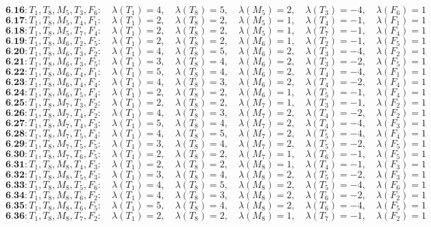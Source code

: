 \documentclass[12p]{article}
\numberwithin{equation}{section}
\begin{document}
\[
\textbf{6.16}: T_1, T_8, M_5, T_3, F_6:\quad \lambda(T_1) = 4,\quad \lambda(T_8) = 5,\quad \lambda(M_5) = 2,\quad \lambda(T_3) = -4,\quad \lambda(F_6) = 1
\]
\[
\textbf{6.17}: T_1, T_8, M_5, T_4, F_1:\quad \lambda(T_1) = 2,\quad \lambda(T_8) = 2,\quad \lambda(M_5) = 1,\quad \lambda(T_4) = -1,\quad \lambda(F_1) = 1
\]
\[
\textbf{6.18}: T_1, T_8, M_5, T_7, F_4:\quad \lambda(T_1) = 2,\quad \lambda(T_8) = 2,\quad \lambda(M_5) = 1,\quad \lambda(T_7) = -1,\quad \lambda(F_4) = 1
\]
\[
\textbf{6.19}: T_1, T_8, M_6, T_2, F_5:\quad \lambda(T_1) = 2,\quad \lambda(T_8) = 2,\quad \lambda(M_6) = 1,\quad \lambda(T_2) = -1,\quad \lambda(F_5) = 1
\]
\[
\textbf{6.20}: T_1, T_8, M_6, T_3, F_2:\quad \lambda(T_1) = 4,\quad \lambda(T_8) = 5,\quad \lambda(M_6) = 2,\quad \lambda(T_3) = -4,\quad \lambda(F_2) = 1
\]
\[
\textbf{6.21}: T_1, T_8, M_6, T_3, F_5:\quad \lambda(T_1) = 3,\quad \lambda(T_8) = 4,\quad \lambda(M_6) = 2,\quad \lambda(T_3) = -2,\quad \lambda(F_5) = 1
\]
\[
\textbf{6.22}: T_1, T_8, M_6, T_4, F_1:\quad \lambda(T_1) = 5,\quad \lambda(T_8) = 4,\quad \lambda(M_6) = 2,\quad \lambda(T_4) = -4,\quad \lambda(F_1) = 1
\]
\[
\textbf{6.23}: T_1, T_8, M_6, T_4, F_4:\quad \lambda(T_1) = 4,\quad \lambda(T_8) = 3,\quad \lambda(M_6) = 2,\quad \lambda(T_4) = -2,\quad \lambda(F_4) = 1
\]
\[
\textbf{6.24}: T_1, T_8, M_6, T_5, F_4:\quad \lambda(T_1) = 2,\quad \lambda(T_8) = 2,\quad \lambda(M_6) = 1,\quad \lambda(T_5) = -1,\quad \lambda(F_4) = 1
\]
\[
\textbf{6.25}: T_1, T_8, M_7, T_3, F_2:\quad \lambda(T_1) = 2,\quad \lambda(T_8) = 2,\quad \lambda(M_7) = 1,\quad \lambda(T_3) = -1,\quad \lambda(F_2) = 1
\]
\[
\textbf{6.26}: T_1, T_8, M_7, T_4, F_2:\quad \lambda(T_1) = 4,\quad \lambda(T_8) = 3,\quad \lambda(M_7) = 2,\quad \lambda(T_4) = -2,\quad \lambda(F_2) = 1
\]
\[
\textbf{6.27}: T_1, T_8, M_7, T_4, F_3:\quad \lambda(T_1) = 5,\quad \lambda(T_8) = 4,\quad \lambda(M_7) = 2,\quad \lambda(T_4) = -4,\quad \lambda(F_3) = 1
\]
\[
\textbf{6.28}: T_1, T_8, M_7, T_5, F_4:\quad \lambda(T_1) = 4,\quad \lambda(T_8) = 5,\quad \lambda(M_7) = 2,\quad \lambda(T_5) = -4,\quad \lambda(F_4) = 1
\]
\[
\textbf{6.29}: T_1, T_8, M_7, T_5, F_5:\quad \lambda(T_1) = 3,\quad \lambda(T_8) = 4,\quad \lambda(M_7) = 2,\quad \lambda(T_5) = -2,\quad \lambda(F_5) = 1
\]
\[
\textbf{6.30}: T_1, T_8, M_7, T_6, F_5:\quad \lambda(T_1) = 2,\quad \lambda(T_8) = 2,\quad \lambda(M_7) = 1,\quad \lambda(T_6) = -1,\quad \lambda(F_5) = 1
\]
\[
\textbf{6.31}: T_1, T_8, M_8, T_4, F_3:\quad \lambda(T_1) = 2,\quad \lambda(T_8) = 2,\quad \lambda(M_8) = 1,\quad \lambda(T_4) = -1,\quad \lambda(F_3) = 1
\]
\[
\textbf{6.32}: T_1, T_8, M_8, T_5, F_3:\quad \lambda(T_1) = 3,\quad \lambda(T_8) = 4,\quad \lambda(M_8) = 2,\quad \lambda(T_5) = -2,\quad \lambda(F_3) = 1
\]
\[
\textbf{6.33}: T_1, T_8, M_8, T_5, F_6:\quad \lambda(T_1) = 4,\quad \lambda(T_8) = 5,\quad \lambda(M_8) = 2,\quad \lambda(T_5) = -4,\quad \lambda(F_6) = 1
\]
\[
\textbf{6.34}: T_1, T_8, M_8, T_6, F_2:\quad \lambda(T_1) = 4,\quad \lambda(T_8) = 3,\quad \lambda(M_8) = 2,\quad \lambda(T_6) = -2,\quad \lambda(F_2) = 1
\]
\[
\textbf{6.35}: T_1, T_8, M_8, T_6, F_5:\quad \lambda(T_1) = 5,\quad \lambda(T_8) = 4,\quad \lambda(M_8) = 2,\quad \lambda(T_6) = -4,\quad \lambda(F_5) = 1
\]
\[
\textbf{6.36}: T_1, T_8, M_8, T_7, F_2:\quad \lambda(T_1) = 2,\quad \lambda(T_8) = 2,\quad \lambda(M_8) = 1,\quad \lambda(T_7) = -1,\quad \lambda(F_2) = 1
\]
\end{document}
